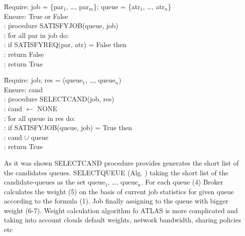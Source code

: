\begin{tabbing}
\hspace{0.5in}\=
     Require: job = \{par$_1$, \ldots, par$_m$\}; queue = \{atr$_1$, \ldots, atr$_n$\} \\
  \> Ensure: True or False \\
  : \hspace{1em}\= procedure SATISFY{\textunderscore}JOB(queue, job) \\
  :             \> \hspace{1em}\= for all par in job do: \\
  :             \>             \> if SATISFY{\textunderscore}REQ(par, atr)%
= False then \\
  :             \>             \> \hspace{2em} return False \\
  :             \>             \> \hspace{1em} return True
\end{tabbing}

\begin{tabbing}
\hspace{0.5in}\=
     Require: job; res = (queue$_1$, \ldots, queue$_n$) \\
  \> Ensure: cand \\
  : \hspace{1em}\= procedure SELECT{\textunderscore}CAND(job, res) \\
  :             \> \hspace{1em}\= cand $\leftarrow$ NONE \\
  :             \> \hspace{1em}\= for all queue in res do: \\
  :             \>             \> if SATISFY{\textunderscore}JOB(queue,%
job) = True then \\
  :             \>             \> \hspace{1em} cand $\cup$ queue \\
  :             \>             \> return True
\end{tabbing}

As it was shown SELECT{\textunderscore}CAND procedure provides generates the
short list of the candidates queues. SELECT{\textunderscore}QUEUE (Alg. )
taking the short list of the candidate-queues as the set queue$_1$, \ldots,
queue$_n$. For each queue (4) Broker calculates the weight (5) on the basis of
current job statistics for given queue according to the formula (1). Job
finally assigning to the queue with bigger weight (6-7). Weight calculation
algorithm fo ATLAS is more complicated and taking into account clouds default
weights, network bandwidth, sharing policies etc

